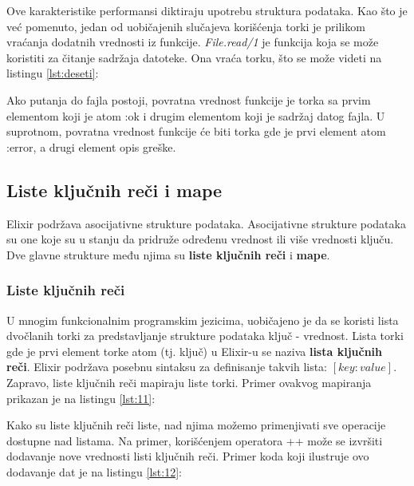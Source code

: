 \documentclass[12pt,oneside]{memoir}
\begin{document}
Ove karakteristike performansi diktiraju upotrebu struktura podataka. Kao što je već pomenuto, jedan od uobičajenih slučajeva korišćenja torki je prilikom vraćanja dodatnih vrednosti iz funkcije. \textit{File.read/1} je funkcija koja se može koristiti za čitanje sadržaja datoteke. Ona vraća torku, što se može videti na listingu \ref{lst:deseti}:



Ako putanja do fajla postoji, povratna vrednost funkcije je torka sa prvim elementom koji je atom :ok i drugim elementom koji je sadržaj datog fajla. U suprotnom, povratna vrednost funkcije će biti torka gde je prvi element atom :error, a drugi element opis greške.

\subsection{Liste ključnih reči i mape}
Elixir podržava asocijativne strukture podataka. Asocijativne strukture podataka su one koje su u stanju da pridruže određenu vrednost ili više vrednosti ključu. Dve glavne strukture među njima su \textbf{liste ključnih reči} i \textbf{mape}.

\subsubsection{Liste ključnih reči}
U mnogim funkcionalnim programskim jezicima, uobičajeno je da se koristi lista dvočlanih torki za predstavljanje strukture podataka ključ - vrednost. Lista torki gde je prvi element torke atom (tj. ključ) u Elixir-u se naziva \textbf{lista ključnih reči}. Elixir podržava posebnu sintaksu za definisanje takvih lista: $[key: value]$. Zapravo, liste ključnih reči mapiraju liste torki. Primer ovakvog mapiranja prikazan je na listingu \ref{lst:11}:




 Kako su liste ključnih reči liste, nad njima možemo primenjivati sve operacije dostupne nad listama. Na primer, korišćenjem operatora ++ može se izvršiti dodavanje nove vrednosti listi ključnih reči. Primer koda koji ilustruje ovo dodavanje dat je na listingu \ref{lst:12}:


\end{document}
